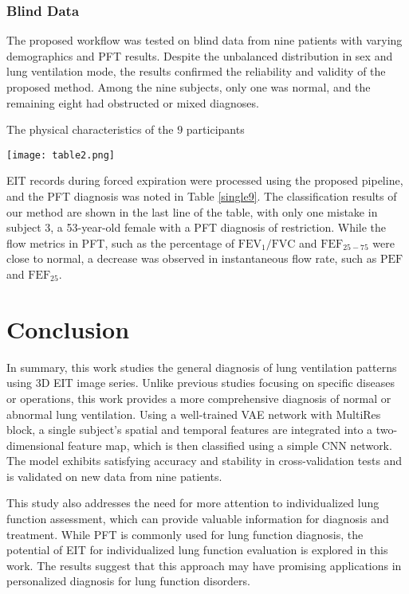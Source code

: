 \documentclass[journal,twoside,web]{ieeecolor}
\begin{document}
\subsubsection{Blind Data}
The proposed workflow was tested on blind data from nine patients with varying demographics and PFT results. Despite the unbalanced distribution in sex and lung ventilation mode, the results confirmed the reliability and validity of the proposed method. Among the nine subjects, only one was normal, and the remaining eight had obstructed or mixed diagnoses.


\begin{table}[!htbp]
	\caption{The physical characteristics of the $9$ participants}
	\texttt{[image: table2.png]} 
	\label{single9}
\end{table}

EIT records during forced expiration were processed using the proposed pipeline, and the PFT diagnosis was noted in Table \ref{single9}. The classification results of our method are shown in the last line of the table, with only one mistake in subject 3, a 53-year-old female with a PFT diagnosis of restriction. While the flow metrics in PFT, such as the percentage of $\text{FEV}_{1}/\text{FVC}$ and $\text{FEF}_{25-75}$ were close to normal, a decrease was observed in instantaneous flow rate, such as $\text{PEF}$ and $\text{FEF}_{25}$.


\section{Conclusion}
\label{conclu}
In summary, this work studies the general diagnosis of lung ventilation patterns using 3D EIT image series. Unlike previous studies focusing on specific diseases or operations, this work provides a more comprehensive diagnosis of normal or abnormal lung ventilation. Using a well-trained VAE network with MultiRes block, a single subject's spatial and temporal features are integrated into a two-dimensional feature map, which is then classified using a simple CNN network. The model exhibits satisfying accuracy and stability in cross-validation tests and is validated on new data from nine patients.

This study also addresses the need for more attention to individualized lung function assessment, which can provide valuable information for diagnosis and treatment. While PFT is commonly used for lung function diagnosis, the potential of EIT for individualized lung function evaluation is explored in this work. The results suggest that this approach may have promising applications in personalized diagnosis for lung function disorders.
\end{document}

